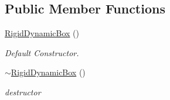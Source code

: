 \subsection*{Public Member Functions}
\begin{DoxyCompactItemize}
\item 
\hypertarget{classContent_1_1Actor_1_1Renderer_1_1RigidDynamicBox_a41c1e4d9d18cd9cecf6da08fc9221273}{
\hyperlink{classContent_1_1Actor_1_1Renderer_1_1RigidDynamicBox_a41c1e4d9d18cd9cecf6da08fc9221273}{RigidDynamicBox} ()}
\label{classContent_1_1Actor_1_1Renderer_1_1RigidDynamicBox_a41c1e4d9d18cd9cecf6da08fc9221273}

\begin{DoxyCompactList}\small\item\em Default Constructor. \item\end{DoxyCompactList}\item 
\hypertarget{classContent_1_1Actor_1_1Renderer_1_1RigidDynamicBox_accaad0716511e42b085fbba9debb2b55}{
\hyperlink{classContent_1_1Actor_1_1Renderer_1_1RigidDynamicBox_accaad0716511e42b085fbba9debb2b55}{$\sim$RigidDynamicBox} ()}
\label{classContent_1_1Actor_1_1Renderer_1_1RigidDynamicBox_accaad0716511e42b085fbba9debb2b55}

\begin{DoxyCompactList}\small\item\em destructor \item\end{DoxyCompactList}\end{DoxyCompactItemize}
